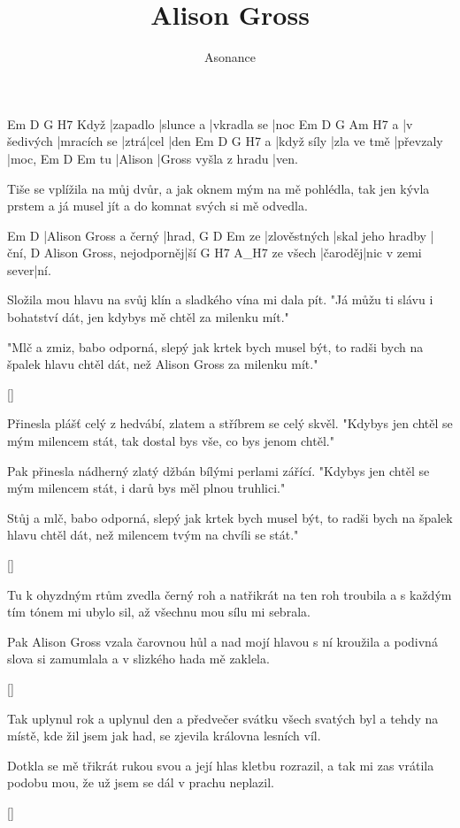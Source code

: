 \documentclass{song}
\title{Alison Gross}
\author{Asonance}
\begin{document}
\begin{multicols}{2}

\strophe
     Em       D         G           H7
Když |zapadlo |slunce a |vkradla se |noc
  Em          D           G    Am   H7
a |v šedivých |mracích se |ztrá|cel |den
  Em         D           G         H7
a |když síly |zla ve tmě |převzaly |moc,
   Em      D                    Em
tu |Alison |Gross vyšla z hradu |ven.
\endstrophe

\strophe*
Tiše se vplížila na můj dvůr,
a jak oknem mým na mě pohlédla,
tak jen kývla prstem a já musel jít
a do komnat svých si mě odvedla.
\endstrophe

Em                    D
|Alison Gross a černý |hrad,
   G            D                 Em
ze |zlověstných |skal jeho hradby |ční,
                         D
Alison Gross, nejodporněj|ší
         G       H7               A_H7
ze všech |čaroděj|nic v zemi sever|ní.
\endstrophe

\strophe*
Složila mou hlavu na svůj klín
a sladkého vína mi dala pít.
"Já můžu ti slávu i bohatství dát,
jen kdybys mě chtěl za milenku mít."
\endstrophe

\strophe*
"Mlč a zmiz, babo odporná,
slepý jak krtek bych musel být,
to radši bych na špalek hlavu chtěl dát,
než Alison Gross za milenku mít."
\endstrophe

\ref{}

\strophe*
Přinesla plášť celý z hedvábí,
zlatem a stříbrem se celý skvěl.
"Kdybys jen chtěl se mým milencem stát,
tak dostal bys vše, co bys jenom chtěl."
\endstrophe

\strophe*
Pak přinesla nádherný zlatý džbán
bílými perlami zářící.
"Kdybys jen chtěl se mým milencem stát,
i darů bys měl plnou truhlici."
\endstrophe

\strophe*
Stůj a mlč, babo odporná,
slepý jak krtek bych musel být,
to radši bych na špalek hlavu chtěl dát,
než milencem tvým na chvíli se stát."
\endstrophe

\ref{}

\strophe*
Tu k ohyzdným rtům zvedla černý roh
a natřikrát na ten roh troubila
a s každým tím tónem mi ubylo sil,
až všechnu mou sílu mi sebrala.
\endstrophe

\strophe*
Pak Alison Gross vzala čarovnou hůl
a nad mojí hlavou s ní kroužila
a podivná slova si zamumlala
a v slizkého hada mě zaklela.
\endstrophe

\ref{}

\strophe*
Tak uplynul rok a uplynul den
a předvečer svátku všech svatých byl
a tehdy na místě, kde žil jsem jak had,
se zjevila královna lesních víl.
\endstrophe

\strophe*
Dotkla se mě třikrát rukou svou
a její hlas kletbu rozrazil,
a tak mi zas vrátila podobu mou,
že už jsem se dál v prachu neplazil.
\endstrophe

\ref{}

\end{multicols}
\end{document}
